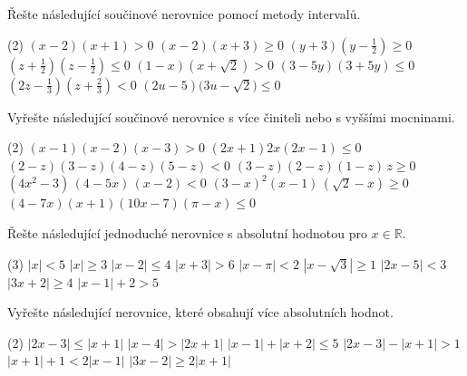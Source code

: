 \documentclass[12pt,a4paper]{article}
\begin{document}
\begin{exercise}
  Řešte následující součinové nerovnice pomocí metody intervalů.  
  \begin{tasks}(2)
    \task \((x-2)(x+1) > 0\)
    \task \((x-2)(x+3) \ge 0\)
    \task \((y+3)\!\left(y-\tfrac{1}{2}\right) \ge 0\)
    \task \(\left(z+\tfrac{1}{2}\right)\!\left(z-\tfrac{1}{2}\right) \le 0\)
    \task \((1-x)(x+\sqrt{2}) > 0\)
    \task \((3-5y)(3+5y) \le 0\)
    \task \(\left(2z-\tfrac{1}{3}\right)\!\left(z+\tfrac{2}{3}\right) < 0\)
    \task \((2u-5)\bigl(3u-\sqrt{2}\bigr) \le 0\)
  \end{tasks}
\end{exercise}


\begin{exercise}
  Vyřešte následující součinové nerovnice s více činiteli nebo s vyššími mocninami.
  \begin{tasks}(2)
    \task \((x-1)(x-2)(x-3) > 0\)
    \task \((2x+1)2x(2x-1) \le 0\)
    \task \((2-z)(3-z)(4-z)(5-z) < 0\)
    \task \((3-z)(2-z)(1-z)\,z \ge 0\)
    \task \((4x^{2}-3)\,(4-5x)\,(x-2) < 0\)
    \task \((3-x)^{2}(x-1)\,(\sqrt{2}-x) \ge 0\)
    \task \((4-7x)(x+1)(10x-7)(\pi-x) \le 0\)
  \end{tasks}
\end{exercise}


\setcounter{section}{4}
\begin{exercise}
  Řešte následující jednoduché nerovnice s absolutní hodnotou pro \(x \in \mathbb{R}\).  
  \begin{tasks}(3)
    \task \(|x| < 5\)
    \task \(|x| \ge 3\)
    \task \(|x - 2| \le 4\)
    \task \(|x + 3| > 6\)
    \task \(|x - \pi| < 2\)
    \task \(|x - \sqrt{3}| \ge 1\)
    \task \(|2x - 5| < 3\)
    \task \(|3x + 2| \ge 4\)
    \task \(|x - 1| + 2 > 5\)
  \end{tasks}
\end{exercise}


\begin{exercise}
  Vyřešte následující nerovnice, které obsahují více absolutních hodnot.  
  \begin{tasks}(2)
    \task \(|2x - 3| \le |x + 1|\)
    \task \(|x - 4| > |2x + 1|\)
    \task \(|x - 1| + |x + 2| \le 5\)
    \task \(|2x - 3| - |x + 1| > 1\)
    \task \(|x + 1| + 1 < 2|x - 1|\)
    \task \(|3x - 2| \ge 2|x + 1|\)
  \end{tasks}
\end{exercise}
\end{document}
